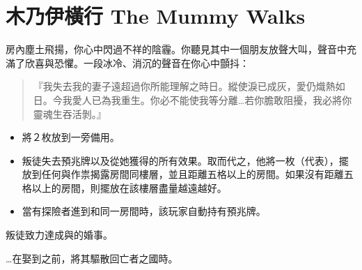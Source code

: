 
\chapter{木乃伊橫行 The Mummy Walks}

\begin{HauntStory}
	房內塵土飛揚，你心中閃過不祥的陰霾。你聽見其中一個朋友放聲大叫，聲音中充滿了欣喜與恐懼。一段冰冷、消沉的聲音在你心中顫抖：

	\begin{quote}
		『我失去我的妻子遠超過你所能理解之時日。縱使淚已成灰，愛仍熾熱如日。今我愛人已為我重生。你必不能使我等分離…若你膽敢阻擾，我必將你靈魂生吞活剝。』
	\end{quote}
\end{HauntStory}

\vspace*{-1em}
\begin{itemize}
	\item 將２枚放到一旁備用。
	\item 叛徒失去預兆牌以及從她獲得的所有效果。取而代之，他將一枚（代表），擺放到任何與作祟揭露房間同樓層，並且距離五格以上的房間。如果沒有距離五格以上的房間，則擺放在該樓層盡量越遠越好。
	\item 當有探險者進到和同一房間時，該玩家自動持有預兆牌。
\end{itemize}

叛徒致力達成與的婚事。

…在娶到之前，將其驅散回亡者之國時。

\vfill\null\pagebreak


